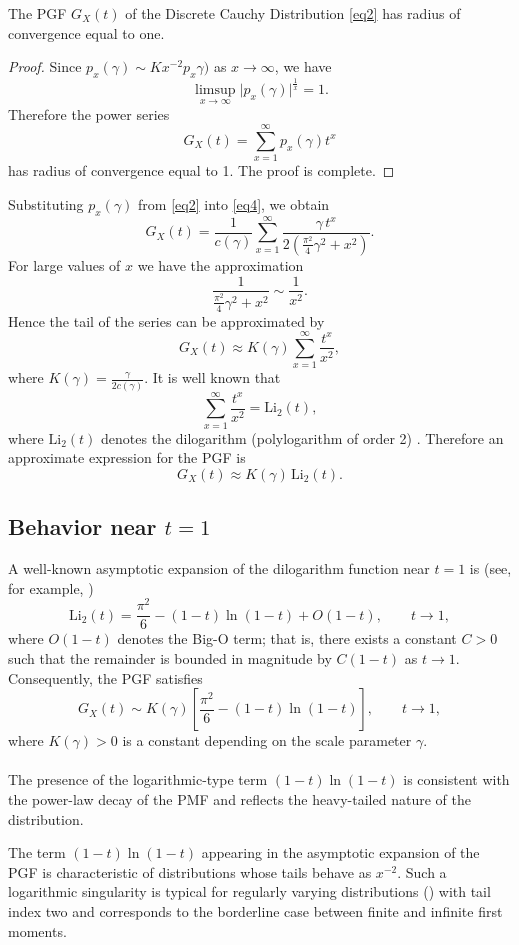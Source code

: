 \documentclass[twoside]{article}
\begin{document}
\begin{pro}
The PGF $G_X(t)$ of the Discrete Cauchy Distribution \eqref{eq2}   has radius of convergence equal to one.
\end{pro}
\begin{proof}
Since $p_x(\gamma) \sim K x^{-2} p_x​\gamma)$ as $x \rightarrow \infty$, we have 
$$
\limsup_{x\to\infty} \big|p_x(\gamma)\big|^{\frac{1}{x}}=1.
$$ 
Therefore the power series
$$
G_X(t)=\sum_{x=1}^{\infty} p_x(\gamma)t^x 
$$
has radius of convergence equal to 1. The proof is complete.
\end{proof}

Substituting $p_x(\gamma)$ from \eqref{eq2} into \eqref{eq4}, we obtain
$$ 
G_X(t)=\frac{1}{c(\gamma)} \sum_{x=1}^{\infty} \frac{\gamma\, t^x}{2\left(\frac{\pi^2}{4}\gamma^2+x^2\right)}. 
$$ 
For large values of $x$ we have the approximation 
$$ 
\frac{1}{\frac{\pi^2}{4}\gamma^2+x^2} \sim \frac{1}{x^2}. 
$$
Hence the tail of the series can be approximated by
$$ 
G_X(t)\approx K(\gamma) \sum_{x=1}^{\infty}\frac{t^x}{x^2}, 
$$ 
where $K(\gamma)=\frac{\gamma}{2c(\gamma)}$.   It is well known that 
$$ 
\sum_{x=1}^{\infty}\frac{t^x}{x^2} = \mathrm{Li}_2(t), 
$$ 
where $\mathrm{Li}_2(t)$ denotes the dilogarithm (polylogarithm of order 2) \cite{Lewin:1981}. Therefore an approximate expression for the PGF is 
$$ 
G_X(t)\approx K(\gamma)\,\mathrm{Li}_2(t). 
$$ 

\subsection{Behavior near $t=1$} 
A well-known asymptotic expansion of the dilogarithm function near $t=1$ is  (see, for example, \cite{Lewin:1981})
$$ 
\mathrm{Li}_2(t) = \frac{\pi^2}{6}-(1-t)\ln(1-t)+O(1-t), \qquad t\to1, 
$$ 
where $O(1-t)$ denotes the Big-O term; that is, there exists a constant $C>0$ such that the remainder is bounded in magnitude by $C(1-t)$ as $t\to1$.  Consequently, the  PGF  satisfies 
\begin{equation}\label{G123}
G_X(t) \sim K(\gamma)\left[\frac{\pi^2}{6}-(1-t)\ln(1-t)\right], \qquad t\to1, 
\end{equation}
where $K(\gamma)>0$ is a constant depending on the scale parameter $\gamma$.\\
\\
The presence of the logarithmic-type term $(1-t)\ln(1-t)$ is consistent with the power-law decay of the PMF and reflects the heavy-tailed nature of the distribution.


\begin{rem}
The   term $(1-t)\ln(1-t)$ appearing in the asymptotic expansion of the PGF is characteristic of distributions whose tails behave as $x^{-2}$. Such a logarithmic singularity is typical for regularly varying distributions (\cite{Bingham:1987})  with tail index two and corresponds to the borderline case between finite and infinite first moments.
\end{rem}
\end{document}
